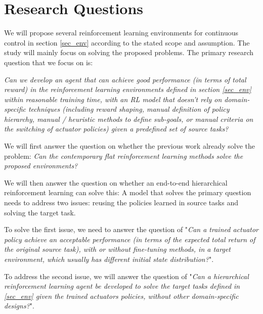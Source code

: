 \section{Research Questions}


We will propose several reinforcement learning environments for continuous control in section \ref{sec_env} according to the stated scope and assumption. The study will mainly focus on solving the proposed problems.
The primary research question that we focus on is:
\begin{center}
    \textit{Can we develop an agent that can achieve good performance (in terms of total reward) in the reinforcement learning environments defined in section \ref{sec_env} within reasonable training time, with an RL model that doesn't rely on domain-specific techniques  (including reward shaping, manual definition of policy hierarchy, manual / heuristic methods to define sub-goals, or manual criteria on the switching of actuator policies) given a predefined set of source tasks?}
\end{center}

We will first answer the question on whether the previous work already solve the problem: \textit{Can the contemporary flat reinforcement learning methods solve the proposed environments?}


We will then answer the question on whether an end-to-end hierarchical reinforcement learning can solve this:
A model that solves the primary question needs to address two issues: reusing the policies learned in source tasks and solving the target task.

To solve the first issue, we need to answer the question of "\textit{Can a trained actuator policy achieve an acceptable performance (in terms of the expected total return of the original source task), with or without fine-tuning methods, in a target environment, which usually has different initial state distribution?}".

To address the second issue, we will answer the question of "\textit{Can a hierarchical reinforcement learning agent be developed to solve the target tasks defined in \ref{sec_env} given the trained actuators policies, without other domain-specific designs?}".

